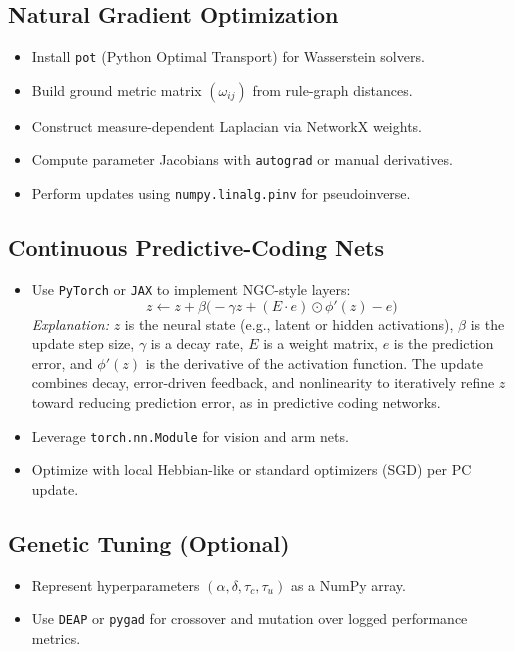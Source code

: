 \documentclass[11pt]{article}
\begin{document}
\subsection{Natural Gradient Optimization}
\begin{itemize}
  \item Install \texttt{pot} (Python Optimal Transport) for Wasserstein solvers.
  \item Build ground metric matrix $(\omega_{ij})$ from rule-graph distances.
  \item Construct measure-dependent Laplacian via NetworkX weights.
  \item Compute parameter Jacobians with \texttt{autograd} or manual derivatives.
  \item Perform updates using \texttt{numpy.linalg.pinv} for pseudoinverse.
\end{itemize}

\subsection{Continuous Predictive-Coding Nets}
\begin{itemize}
  \item Use \texttt{PyTorch} or \texttt{JAX} to implement NGC-style layers:
  \[
    z \leftarrow z + \beta\bigl(-\gamma z + (E\cdot e)\odot \phi'(z) - e\bigr)
  \]
  \textit{Explanation:} $z$ is the neural state (e.g., latent or hidden activations), $\beta$ is the update step size, $\gamma$ is a decay rate, $E$ is a weight matrix, $e$ is the prediction error, and $\phi'(z)$ is the derivative of the activation function. The update combines decay, error-driven feedback, and nonlinearity to iteratively refine $z$ toward reducing prediction error, as in predictive coding networks.
  \item Leverage \texttt{torch.nn.Module} for vision and arm nets.
  \item Optimize with local Hebbian-like or standard optimizers (SGD) per PC update.
\end{itemize}

\subsection{Genetic Tuning (Optional)}
\begin{itemize}
  \item Represent hyperparameters $(\alpha,\delta,\tau_c,\tau_u)$ as a NumPy array.
  \item Use \texttt{DEAP} or \texttt{pygad} for crossover and mutation over logged performance metrics.
\end{itemize}
\end{document}
